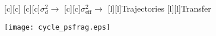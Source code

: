 \documentclass{article}
\begin{document}
\begin{figure}[htb]
  \begin{center}

        [c][c]{}
        [c][c]{$\sigma_d^2 \rightarrow$}
        [c][c]{$\sigma_{\mathrm{eff}}^2 \rightarrow$}
        [l][l]{Trajectories}
        [l][l]{Transfer}
        

    \texttt{[image: cycle\_psfrag.eps]}
    \end{center}
\end{figure}
\end{document}
